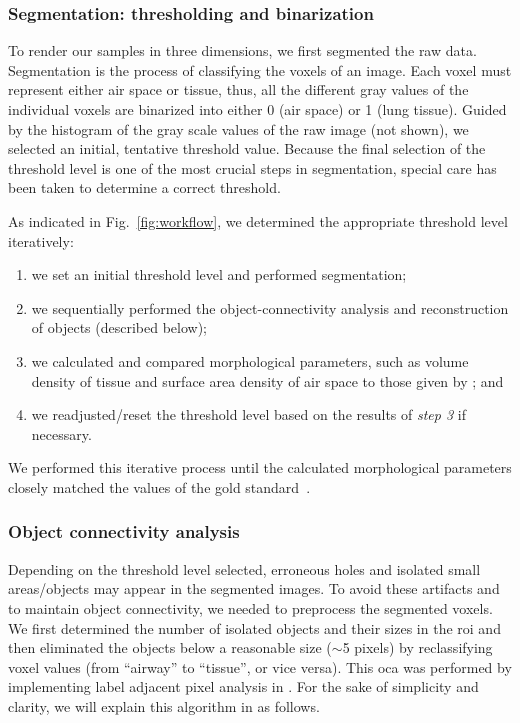 \subsubsection{Segmentation: thresholding and binarization}
To render our samples in three dimensions, we first segmented the raw data. Segmentation is the process of classifying the voxels of an image. Each voxel must represent either air space or tissue, thus, all the different gray values of the individual voxels are binarized into either 0 (air space) or 1 (lung tissue). Guided by the histogram of the gray scale values of the raw image (not shown), we selected an initial, tentative threshold value. Because the final selection of the threshold level is one of the most crucial steps in segmentation, special care has been taken to determine a correct threshold.

As indicated in Fig.~\ref{fig:workflow}, we determined the appropriate threshold level iteratively: 
\begin{enumerate}
	\item we set an initial threshold level and performed segmentation;
	\item we sequentially performed the object-connectivity analysis and \threed reconstruction of objects (described below);
	\item we calculated and compared morphological parameters, such as volume density of tissue and surface area density of air space to those given by \citet{Tschanz2003}; and
	\item we readjusted/reset the threshold level based on the results of \textit{step 3} if necessary.
\end{enumerate}

We performed this iterative process until the calculated morphological parameters closely matched the values of the gold standard~\cite{Tschanz2003}.

\subsubsection{Object connectivity analysis}
Depending on the threshold level selected, erroneous holes and isolated small areas/objects may appear in the segmented images. To avoid these artifacts and to maintain object connectivity, we needed to preprocess the segmented voxels. We first determined the number of isolated objects and their sizes in the \ac{roi} and then eliminated the objects below a reasonable size ($\sim$5 pixels) by reclassifying voxel values (from ``airway'' to ``tissue'', or vice versa). This \ac{oca} was performed by implementing label adjacent pixel analysis in \threed \cite{Ballard1982,Davies1990,Gonzalez1992}. For
the sake of simplicity and clarity, we will explain this algorithm in \twod as follows.

